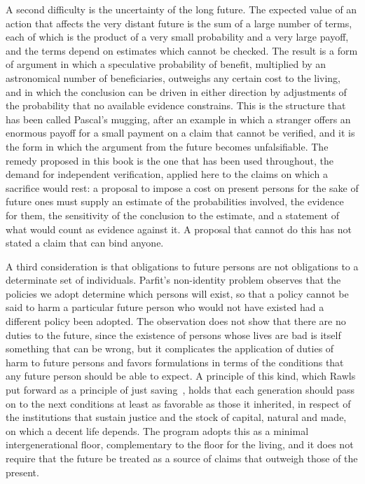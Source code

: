 A second difficulty is the uncertainty of the long future. The expected value of an action that affects the very distant future is the sum of a large number of terms, each of which is the product of a very small probability and a very large payoff, and the terms depend on estimates which cannot be checked. The result is a form of argument in which a speculative probability of benefit, multiplied by an astronomical number of beneficiaries, outweighs any certain cost to the living, and in which the conclusion can be driven in either direction by adjustments of the probability that no available evidence constrains. This is the structure that has been called Pascal's mugging, after an example in which a stranger offers an enormous payoff for a small payment on a claim that cannot be verified, and it is the form in which the argument from the future becomes unfalsifiable. The remedy proposed in this book is the one that has been used throughout, the demand for independent verification, applied here to the claims on which a sacrifice would rest: a proposal to impose a cost on present persons for the sake of future ones must supply an estimate of the probabilities involved, the evidence for them, the sensitivity of the conclusion to the estimate, and a statement of what would count as evidence against it. A proposal that cannot do this has not stated a claim that can bind anyone.

A third consideration is that obligations to future persons are not obligations to a determinate set of individuals. Parfit's non-identity problem observes that the policies we adopt determine which persons will exist, so that a policy cannot be said to harm a particular future person who would not have existed had a different policy been adopted. The observation does not show that there are no duties to the future, since the existence of persons whose lives are bad is itself something that can be wrong, but it complicates the application of duties of harm to future persons and favors formulations in terms of the conditions that any future person should be able to expect. A principle of this kind, which Rawls put forward as a principle of just saving~\cite{rawls1971}, holds that each generation should pass on to the next conditions at least as favorable as those it inherited, in respect of the institutions that sustain justice and the stock of capital, natural and made, on which a decent life depends. The program adopts this as a minimal intergenerational floor, complementary to the floor for the living, and it does not require that the future be treated as a source of claims that outweigh those of the present.

